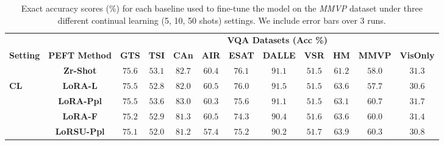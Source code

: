\begin{table}
\caption{Exact accuracy scores (\%) for each baseline used to fine-tune the model on the \emph{MMVP} dataset under three different continual learning (5, 10, 50 shots)  settings. We include error bars over 3 runs.}
 \label{table:fine_tune_llm_mmvp}
 \vskip 0.15in
\begin{center}
\begingroup
\setlength{\tabcolsep}{6.4pt}
\begin{tabular}{l c c c c c c c c c c c}
\toprule
 & & \multicolumn{10}{c}{\textbf{VQA Datasets (Acc \%)}}  \\
\cmidrule(lr){3-12}
\textbf{Setting} & \textbf{PEFT Method}  & \textbf{GTS} & \textbf{TSI} & \textbf{CAn} & \textbf{AIR} & \textbf{ESAT} & \textbf{DALLE} & \textbf{VSR} & \textbf{HM} & \textbf{MMVP} & \textbf{VisOnly} \\
\midrule
 & \textbf{Zr-Shot} & $75.6$ & $53.1$ & $82.7$ & $60.4$ & $76.1$ & $91.1$ & $51.5$ & $61.2$ & $58.0$ & $31.3$ \\
\midrule
\multirow{4}{*}{\textbf{CL}} & \textbf{LoRA-L} & $75.5$ & $52.8$ & $82.0$ & $60.5$ & $76.0$ & $91.5$ & $51.5$ & $63.6$ & $57.7$ & $30.6$ \\
& \textbf{LoRA-Ppl} & $75.5$ & $53.6$ & $83.0$ & $60.3$ & $75.6$ & $91.1$ & $51.5$ & $63.1$ & $60.7$ & $31.7$ \\
& \textbf{LoRA-F} & $75.2$ & $52.9$ & $81.3$ & $60.5$ & $74.3$ & $90.4$ & $51.6$ & $63.6$ & $60.0$ & $31.4$ \\
& \textbf{LoRSU-Ppl} & $75.1$ & $52.0$ & $81.2$ & $57.4$ & $75.2$ & $90.2$ & $51.7$ & $63.9$ & $60.3$ & $30.8$ \\
\bottomrule
\end{tabular}
\endgroup
\end{center}
\vskip -0.1in
\end{table}


